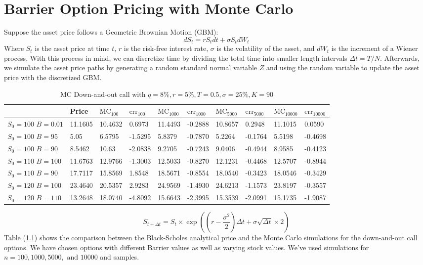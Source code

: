 \chapter{Barrier Option Pricing with Monte Carlo}
Suppose the asset price follows a Geometric Brownian Motion (GBM):
\begin{equation}\label{eq:GBM}
	dS_t=rS_tdt+\sigma S_tdW_t
\end{equation}
Where $S_t$ is the asset price at time $t$, $r$ is the risk-free interest rate, $\sigma$ is the volatility of the asset, and $dW_t$ is the increment of a Wiener process. With this process in mind, we can discretize time by dividing the total time into smaller length intervals $\Delta t=T/N.$ Afterwards, we simulate the asset price paths by generating a random standard normal variable $Z$ and using the random variable to update the asset price with the discretized GBM.

\begin{center}
	\begin{table}[H]
    \begin{tabular}{ | m{4em} | m{1.3cm}| m{1.3cm} | m{1.3cm}| m{1.3cm} | m{1.3cm} | m{1.3cm} | m{1.3cm} | m{1.35cm} | m{1.3cm} |} 
  \hline
   & Price & $\text{MC}_{100}$ & $\text{err}_{100}$ & $\text{MC}_{1000}$ & $\text{err}_{1000}$ & $\text{MC}_{5000}$ & $\text{err}_{5000}$ & $\text{MC}_{10000}$ & $\text{err}_{10000}$  \\ 
   \hline
   $S_0=100$ $B=0.01$ &11.1605&10.4632&0.6973&11.4493&-0.2888&10.8657&0.2948&11.1015&0.0590\\
  \hline
  $S_0=100$ $B=95$ & 5.05 & 6.5795 & -1.5295 & 5.8379  & -0.7870 & 5.2264 & -0.1764 & 5.5198 & -0.4698\\ 
  \hline
  $S_0=100$ $B=90$ & 8.5462 & 10.63  & -2.0838 & 9.2705 & -0.7243 & 9.0406 & -0.4944 & 8.9585  & -0.4123\\ 
  \hline 
  $S_0=110$ $B=100$ &11.6763&12.9766&-1.3003&12.5033&-0.8270&12.1231&-0.4468&12.5707&-0.8944 \\
  \hline
  $S_0=110$ $B=90$ &17.7117&15.8569&1.8548&18.5671&-0.8554&18.0540&-0.3423&18.0546&-0.3429\\
  \hline
   $S_0=120$ $B=100$ & 23.4640 & 20.5357  & 2.9283 & 24.9569  & -1.4930 & 24.6213 & -1.1573 & 23.8197 & -0.3557 \\ 
  \hline
  $S_0=120$ $B=110$ & 13.2648 & 18.0740 & -4.8092 & 15.6643 & -2.3995 & 15.3539 & -2.0991 & 15.1735 & -1.9087\\ 
  \hline
\end{tabular}
\caption{MC Down-and-out call with $q=8\%,r=5\%, T=0.5,\sigma=25\%,K=90$}
\label{tab:MC_barrer}
\end{table}
\end{center}
\begin{equation}
	S_{t+\Delta t}=S_t\times\exp\left(\left(r-\frac{\sigma^2}{2}\right)\Delta t+\sigma\sqrt{\Delta t}\times 2\right)
\end{equation}
Table (\ref{tab:MC_barrer}) shows the comparison between the Black-Scholes analytical price and the Monte Carlo simulations for the down-and-out call options. We have chosen options with different Barrier values as well as varying stock values. We've used simulations for $n=100,1000,5000,\text{ and }10000$ and samples.
